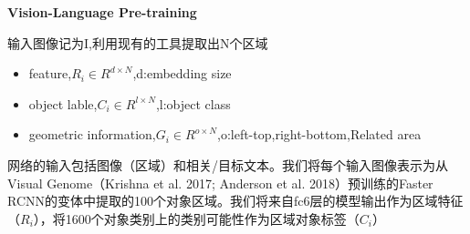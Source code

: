\documentclass[a4paper]{article}
\begin{document}
\begin{sloppypar}

      \centerline{\textbf{Vision-Language Pre-training}}

      输入图像记为I,利用现有的工具提取出N个区域

      \begin{itemize}
            \item feature,$R_i \in R^{d \times N}$,d:embedding size
            \item object lable,$C_i \in R^{l \times N}$,l:object class
            \item geometric information,$G_i \in R^{o \times N}$,o:left-top,right-bottom,Related area
      \end{itemize}




      网络的输入包括图像（区域）和相关/目标文本。我们将每个输入图像表示为从Visual Genome（Krishna et al. 2017; Anderson et al. 2018）预训练的Faster RCNN的变体中提取的100个对象区域。我们将来自fc6层的模型输出作为区域特征（$R_i$），将1600个对象类别上的类别可能性作为区域对象标签（$C_i$）


\end{sloppypar}
\end{document}

